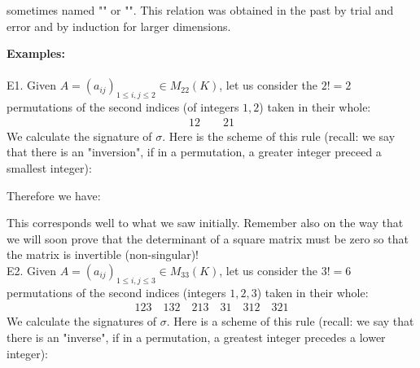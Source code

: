 	sometimes named "" or "". This relation was obtained in the past by trial and error and by induction for larger dimensions.
	
	\pagebreak
	\begin{tcolorbox}[colframe=black,colback=white,sharp corners]
	\textbf{{\Large {}}Examples:}\\\\
	E1. Given $A=(a_{ij})_{1\leq i,j\leq 2}\in M_{22}(K)$, let us consider the $2!=2$ permutations of the second indices (of integers $1,2$) taken in their whole:
	\begin{gather*}
		12 \qquad 21
	\end{gather*}
	We calculate the signature of $\sigma$. Here is the scheme of this rule (recall: we say that there is an "inversion", if in a permutation, a greater integer preceed a smallest integer):
	
	Therefore we have:
	
	This corresponds well to what we saw initially. Remember also on the way that we will soon prove that the determinant of a square matrix must be zero so that the matrix is invertible (non-singular)!\\
	
	E2. Given $A=(a_{ij})_{1\leq i,j\leq 3} \in M_{33}(K)$, let us consider the $3!=6$ permutations of the second indices (integers $1,2,3$) taken in their whole:
	\begin{align*}
	123 \quad 132 \quad 213 \quad 31 \quad 312 \quad 321
	\end{align*}
	We calculate the signatures of $\sigma$. Here is a scheme of this rule (recall: we say that there is an "inverse", if in a permutation, a greatest integer precedes a lower integer):
	
	\end{tcolorbox}
	
